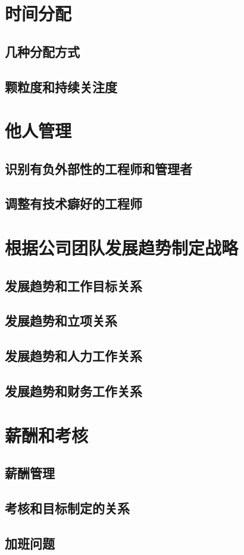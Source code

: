 
\section{时间分配}
\subsection{几种分配方式} %
\subsection{颗粒度和持续关注度}

\section{他人管理}
\subsection{识别有负外部性的工程师和管理者}
\subsection{调整有技术癖好的工程师} %

\section{根据公司团队发展趋势制定战略}
\subsection{发展趋势和工作目标关系}
\subsection{发展趋势和立项关系}
\subsection{发展趋势和人力工作关系}
\subsection{发展趋势和财务工作关系}

\section{薪酬和考核}
\subsection{薪酬管理}
\subsection{考核和目标制定的关系}
\subsection{加班问题}

